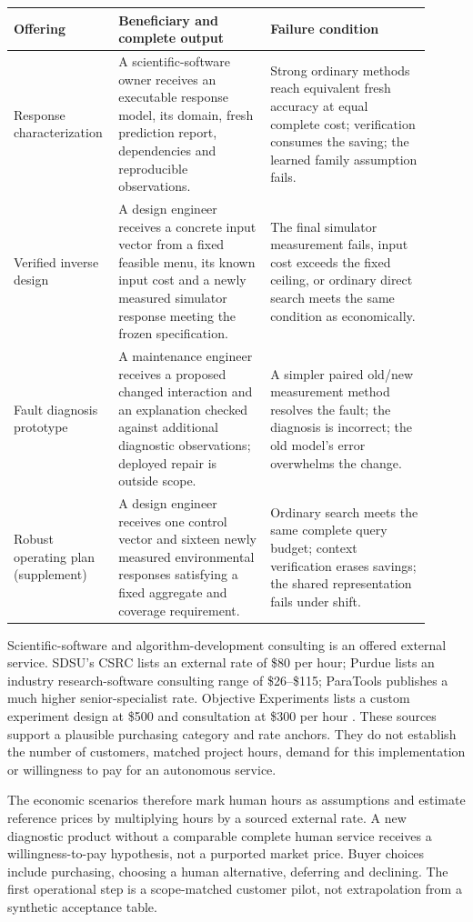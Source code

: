 \documentclass[11pt,letterpaper]{article}
\newcommand{\money}[1]{\$#1}
\begin{document}
\begin{longtable}{p{0.19\linewidth}p{0.35\linewidth}p{0.37\linewidth}}
\toprule
Offering & Beneficiary and complete output & Failure condition \\
\midrule
Response characterization & A scientific-software owner receives an executable response model, its domain, fresh prediction report, dependencies and reproducible observations. & Strong ordinary methods reach equivalent fresh accuracy at equal complete cost; verification consumes the saving; the learned family assumption fails. \\
Verified inverse design & A design engineer receives a concrete input vector from a fixed feasible menu, its known input cost and a newly measured simulator response meeting the frozen specification. & The final simulator measurement fails, input cost exceeds the fixed ceiling, or ordinary direct search meets the same condition as economically. \\
Fault diagnosis prototype & A maintenance engineer receives a proposed changed interaction and an explanation checked against additional diagnostic observations; deployed repair is outside scope. & A simpler paired old/new measurement method resolves the fault; the diagnosis is incorrect; the old model's error overwhelms the change. \\
Robust operating plan (supplement) & A design engineer receives one control vector and sixteen newly measured environmental responses satisfying a fixed aggregate and coverage requirement. & Ordinary search meets the same complete query budget; context verification erases savings; the shared representation fails under shift. \\
\bottomrule
\end{longtable}

Scientific-software and algorithm-development consulting is an offered external service. SDSU's CSRC lists an external rate of \money{80} per hour; Purdue lists an industry research-software consulting range of \money{26}--\money{115}; ParaTools publishes a much higher senior-specialist rate. Objective Experiments lists a custom experiment design at \money{500} and consultation at \money{300} per hour \cite{sdsu,purdue,paratools,objective}. These sources support a plausible purchasing category and rate anchors. They do not establish the number of customers, matched project hours, demand for this implementation or willingness to pay for an autonomous service.

The economic scenarios therefore mark human hours as assumptions and estimate reference prices by multiplying hours by a sourced external rate. A new diagnostic product without a comparable complete human service receives a willingness-to-pay hypothesis, not a purported market price. Buyer choices include purchasing, choosing a human alternative, deferring and declining. The first operational step is a scope-matched customer pilot, not extrapolation from a synthetic acceptance table.
\end{document}
